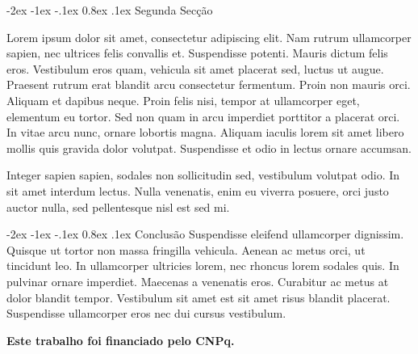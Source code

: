 \documentclass[plainsections,  36pt]{sciposter}
\makeatletter
\newcommand{\largo}{\fontsize{36}{40}\selectfont }
\renewcommand\section{\@startsection {section}{1}{\z@}%
                                   {-2ex \@plus -1ex \@minus -.1ex}%
                                   {0.8ex \@plus.1ex}%
                                   {\normalfont\largo\bfseries}}
\makeatother
\begin{document}
\begin{multicols}{2}
\section{Segunda Secção}





 Lorem ipsum dolor sit amet, consectetur adipiscing elit. Nam rutrum ullamcorper sapien, nec ultrices felis convallis et. Suspendisse potenti. Mauris dictum felis eros. Vestibulum eros quam, vehicula sit amet placerat sed, luctus ut augue. Praesent rutrum erat blandit arcu consectetur fermentum. Proin non mauris orci. Aliquam et dapibus neque. Proin felis nisi, tempor at ullamcorper eget, elementum eu tortor. Sed non quam in arcu imperdiet porttitor a placerat orci. In vitae arcu nunc, ornare lobortis magna. Aliquam iaculis lorem sit amet libero mollis quis gravida dolor volutpat. Suspendisse et odio in lectus ornare accumsan.

Integer sapien sapien, sodales non sollicitudin sed, vestibulum volutpat odio. In sit amet interdum lectus.
Nulla venenatis, enim eu viverra posuere, orci justo auctor nulla, sed pellentesque nisl est sed mi.




\section{Conclusão}
Suspendisse eleifend ullamcorper dignissim. Quisque ut tortor non massa fringilla vehicula. 
Aenean ac metus orci, ut tincidunt leo. In ullamcorper ultricies lorem, nec rhoncus lorem sodales quis.
In pulvinar ornare imperdiet. Maecenas a venenatis eros. Curabitur ac metus at dolor blandit tempor.
Vestibulum sit amet est sit amet risus blandit placerat. Suspendisse ullamcorper eros nec dui cursus vestibulum. 



\vspace{1cm}
 \textbf{Este trabalho foi financiado pelo CNPq. }







\end{multicols}
\end{document}
